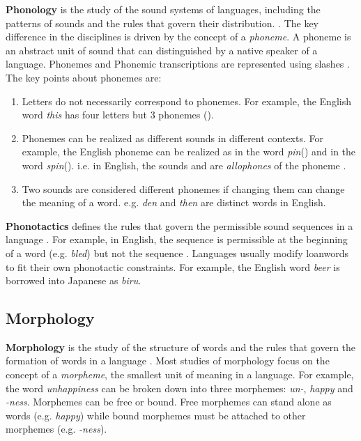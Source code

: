 \textbf{Phonology} is the study of the sound systems of languages, including the patterns of sounds and the rules that govern their distribution. \cite{trask2007language}.
The key difference in the disciplines is driven by the concept of a \textit{phoneme}. A phoneme is an abstract unit of sound that can distinguished
by a native speaker of a language. Phonemes and Phonemic transcriptions are represented using slashes \textipa{/ /}. The key points about phonemes are:
\begin{enumerate}
    \item Letters do not necessarily correspond to phonemes. For example, the English word \textit{this} has four letters but 3 phonemes ().
    \item Phonemes can be realized as different sounds in different contexts. For example, the English phoneme  can be realized as
    \textipa{[p\super{h}]} in the word \textit{pin}(\textipa{[p\super{h}In]}) and \textipa{[p]} in the word \textit{spin}(\textipa{[spIn]}).
    i.e. in English, the sounds \textipa{[p]} and \textipa{[p\super{h}]} are \textit{allophones} of the phoneme .
    \item Two sounds are considered different phonemes if changing them can change the meaning of a word. e.g. \textipa{[dEn]} \textit{den} and 
    \textipa{[DEn]} \textit{then} are distinct words in English.
\end{enumerate}


\textbf{Phonotactics} defines the rules that govern the permissible sound sequences in a language \cite{trask2007language}. For example, in English,
the sequence  is permissible at the beginning of a word (e.g. \textit{bled}) but not the sequence . Languages usually
modify loanwords to fit their own phonotactic constraints. For example, the English word \textit{beer} is borrowed into Japanese as \textit{biru}.


\subsection{Morphology}
\textbf{Morphology} is the study of the structure of words and the rules that govern the formation of words in a language \cite{trask2007language}.
Most studies of morphology focus on the concept of a \textit{morpheme}, the smallest unit of meaning in a language. For example, the word \textit{unhappiness}
can be broken down into three morphemes: \textit{un-}, \textit{happy} and \textit{-ness}. Morphemes can be free or bound. Free morphemes can stand
alone as words (e.g. \textit{happy}) while bound morphemes must be attached to other morphemes (e.g. \textit{-ness}).

